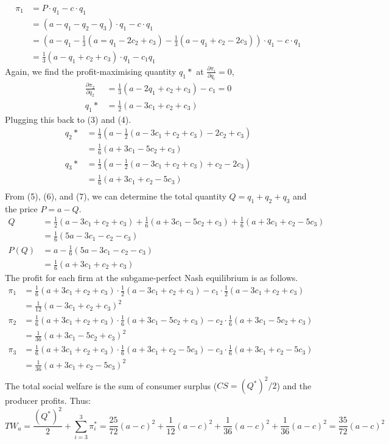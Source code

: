 \documentclass[10pt,a4paper]{article}
\begin{document}
\begin{align*}
	\pi_1 &= P \cdot q_1 - c \cdot q_1 \\
	&= (a - q_1 - q_2 - q_3) \cdot q_1 - c \cdot q_1 \\
	&= (a - q_1 - \frac{1}{3} (a = q_1 - 2c_2 + c_3) - \frac{1}{3} (a - q_1 + c_2 - 2c_3)) \cdot q_1 - c \cdot q_1 \\
	&= \frac{1}{3}(a - q_1 + c_2 + c_3) \cdot q_1 - c_1 q_1
\end{align*}
Again, we find the profit-maximising quantity $q_1*$ at $\frac{\partial \pi_i}{\partial q_i} = 0$,
\begin{align*}
	\frac{\partial \pi_2}{\partial q_2} &= \frac{1}{3}(a - 2q_1 + c_2 + c_3) - c_1 = 0 \\
	q_1* &= \frac{1}{2} (a - 3c_1 + c_2 + c_3)
\end{align*}
Plugging this back to (3) and (4).
\begin{align*}
	q_2* &= \frac{1}{3} (a - \frac{1}{2} (a - 3c_1 + c_2 + c_3) - 2c_2 + c_3) \\
	&= \frac{1}{6} (a + 3c_1 - 5c_2 + c_3) \\
	q_3* &= \frac{1}{3} (a -\frac{1}{2} (a - 3c_1 + c_2 + c_3) + c_2 - 2c_3) \\
	&= \frac{1}{6} (a + 3c_1 + c_2 - 5c_3) \\
\end{align*}
From (5), (6), and (7), we can determine the total quantity $Q = q_1 + q_2 + q_3$ and the price $P = a - Q$.
\begin{align*}
	Q &= \frac{1}{2} (a - 3c_1 + c_2 + c_3) + \frac{1}{6} (a + 3c_1 - 5c_2 + c_3) + \frac{1}{6} (a + 3c_1 + c_2 - 5c_3) \\
	&= \frac{1}{6} (5a - 3c_1 - c_2 - c_3) \\
	P(Q) &= a - \frac{1}{6} (5a - 3c_1 - c_2 - c_3) \\
	&= \frac{1}{6} (a + 3c_1 + c_2 + c_3)
\end{align*}
The profit for each firm at the subgame-perfect Nash equilibrium is as follows.
\begin{align*}
	\pi_1 &= \frac{1}{6} (a + 3c_1 + c_2 + c_3) \cdot \frac{1}{2} (a - 3c_1 + c_2 + c_3) - c_1 \cdot \frac{1}{2} (a - 3c_1 + c_2 + c_3) \\
	&= \frac{1}{12}(a - 3c_1 + c_2 + c_3)^2\\
	\pi_2 &= \frac{1}{6} (a + 3c_1 + c_2 + c_3) \cdot \frac{1}{6} (a + 3c_1 - 5c_2 + c_3) - c_2 \cdot \frac{1}{6} (a + 3c_1 - 5c_2 + c_3) \\
	&= \frac{1}{36} (a + 3c_1 - 5c_2 + c_3)^2 \\
	\pi_3 &= \frac{1}{6} (a + 3c_1 + c_2 + c_3) \cdot \frac{1}{6} (a + 3c_1 + c_2 - 5c_3) - c_3 \cdot \frac{1}{6} (a + 3c_1 + c_2 - 5c_3) \\
	&= \frac{1}{36} (a + 3c_1 + c_2 - 5c_3)^2 \\
\end{align*}
The total social welfare is the sum of consumer surplus ($CS = (Q^*)^2/2$) and the producer profits. Thus:
\begin{equation}
	TW_a = \frac{(Q^*)^2}{2} + \sum\limits_{i=3}^3 \pi^*_i = \frac{25}{72} (a-c)^2+\frac{1}{12} (a-c)^2+\frac{1}{36} (a-c)^2+\frac{1}{36} (a-c)^2 = \frac{35}{72} (a-c)^2
\end{equation}
\end{document}
